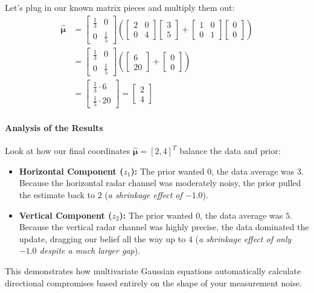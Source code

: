 \documentclass{article}
\begin{document}
Let's plug in our known matrix pieces and multiply them out:
\begin{align}
\hat{\boldsymbol{\mu}} &= \begin{bmatrix} \frac{1}{3} & 0 \\ 0 & \frac{1}{5} \end{bmatrix} \left( \begin{bmatrix} 2 & 0 \\ 0 & 4 \end{bmatrix}\begin{bmatrix} 3 \\ 5 \end{bmatrix} + \begin{bmatrix} 1 & 0 \\ 0 & 1 \end{bmatrix}\begin{bmatrix} 0 \\ 0 \end{bmatrix} \right) \nonumber \\
&= \begin{bmatrix} \frac{1}{3} & 0 \\ 0 & \frac{1}{5} \end{bmatrix} \left( \begin{bmatrix} 6 \\ 20 \end{bmatrix} + \begin{bmatrix} 0 \\ 0 \end{bmatrix} \right) \nonumber \\
&= \begin{bmatrix} \frac{1}{3} \cdot 6 \\ \frac{1}{5} \cdot 20 \end{bmatrix} = \begin{bmatrix} 2 \\ 4 \end{bmatrix} \tag{68}
\end{align}

\paragraph{Analysis of the Results}
Look at how our final coordinates $\hat{\boldsymbol{\mu}} = [2, 4]^T$ balance the data and prior:
\begin{itemize}
    \item \textbf{Horizontal Component ($z_1$):} The prior wanted $0$, the data average was $3$. Because the horizontal radar channel was moderately noisy, the prior pulled the estimate back to $2$ (\textit{a shrinkage effect of $-1.0$}).
    \item \textbf{Vertical Component ($z_2$):} The prior wanted $0$, the data average was $5$. Because the vertical radar channel was highly precise, the data dominated the update, dragging our belief all the way up to $4$ (\textit{a shrinkage effect of only $-1.0$ despite a much larger gap}).
\end{itemize}
This demonstrates how multivariate Gaussian equations automatically calculate directional compromises based entirely on the shape of your measurement noise.
\end{document}
